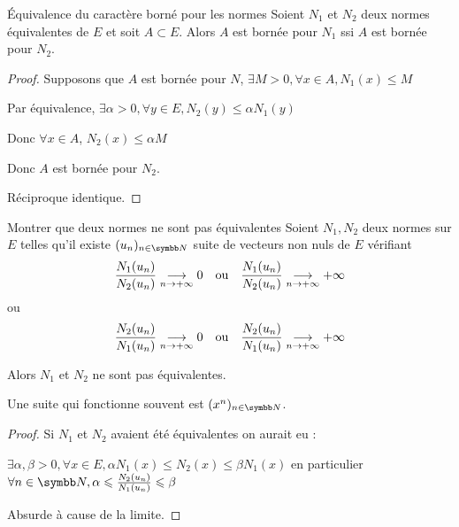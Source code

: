 \begin{proposition}{Équivalence du caractère borné pour les normes}{}
    Soient $N_1$ et $N_2$ deux normes équivalentes de $E$ et soit $A \subset E$. 
    Alors $A$ est bornée pour $N_1$ ssi $A$ est bornée pour $N_2$.
\end{proposition}


\begin{proof}
    Supposons que $A$ est bornée pour $N$, $\exists M > 0, \forall x \in A, N_1(x) \leqslant M$

    Par équivalence, $\exists \alpha > 0, \forall y \in E, N_2(y) \leqslant \alpha N_1(y)$

    Donc $\forall x \in A$, $N_2(x) \leqslant \alpha M$

    Donc $A$ est bornée pour $N_2$.

    Réciproque identique.
\end{proof}

\begin{proposition}{Montrer que deux normes ne sont pas équivalentes}{}
    Soient $N_1, N_2$ deux normes sur $E$ telles qu'il existe $(u_n)_{n \in \N}$ suite
    de vecteurs non nuls de $E$ vérifiant 
    \[\frac{N_1(u_n )}{N_2(u_n )} \underset{n \to + \infty}{\longrightarrow} 0 \quad \text{ou} \quad \frac{N_1(u_n )}{N_2(u_n )} \underset{n \to + \infty}{\longrightarrow} + \infty\]
    ou
    \[\frac{N_2(u_n )}{N_1(u_n )} \underset{n \to + \infty}{\longrightarrow} 0 \quad \text{ou} \quad \frac{N_2(u_n )}{N_1(u_n )} \underset{n \to + \infty}{\longrightarrow} + \infty\]

    Alors $N_1$ et $N_2$ ne sont pas équivalentes.
\end{proposition}

\begin{remarque}
    Une suite qui fonctionne souvent est $(x^n)_{n \in \N}$.
\end{remarque}


\begin{proof}
    Si $N_1$ et $N_2$ avaient été équivalentes on aurait eu :
    
    $\exists \alpha, \beta > 0, \forall x \in E, \alpha N_1(x) \leqslant N_2(x) \leqslant \beta N_1(x)$
    en particulier $\forall n \in \N, \alpha \leqslant \frac{N_2(u_n)}{N_1(u_n)} \leqslant \beta$

    Absurde à cause de la limite.
\end{proof}

